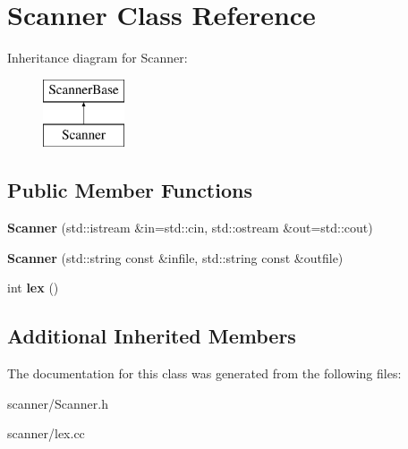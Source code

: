 \hypertarget{classScanner}{\section{Scanner Class Reference}
\label{classScanner}
}
Inheritance diagram for Scanner\+:\begin{figure}[H]
\begin{center}
\leavevmode
\includegraphics[height=2.000000cm]{classScanner}
\end{center}
\end{figure}
\subsection*{Public Member Functions}
\begin{DoxyCompactItemize}
\item 
\hypertarget{classScanner_a2987a0c6aba4250e6cb1c84453d682ff}{{\bfseries Scanner} (std\+::istream \&in=std\+::cin, std\+::ostream \&out=std\+::cout)}\label{classScanner_a2987a0c6aba4250e6cb1c84453d682ff}

\item 
\hypertarget{classScanner_ad27971ec11ede59d0b041284306b6d1f}{{\bfseries Scanner} (std\+::string const \&infile, std\+::string const \&outfile)}\label{classScanner_ad27971ec11ede59d0b041284306b6d1f}

\item 
\hypertarget{classScanner_a6fa640fdbafd7b173be91598708d26a4}{int {\bfseries lex} ()}\label{classScanner_a6fa640fdbafd7b173be91598708d26a4}

\end{DoxyCompactItemize}
\subsection*{Additional Inherited Members}


The documentation for this class was generated from the following files\+:\begin{DoxyCompactItemize}
\item 
scanner/Scanner.\+h\item 
scanner/lex.\+cc\end{DoxyCompactItemize}
